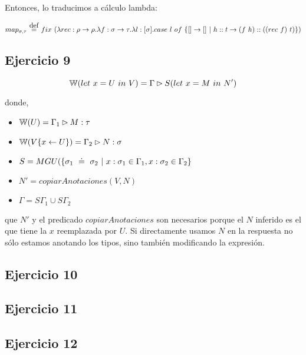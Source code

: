Entonces, lo traducimos a cálculo lambda:

\[map_{\sigma,\tau} \eqdef fix\ (\abs{rec}{\rho\to\rho}{\abs{f}{\sigma\to\tau}{\abs{l}{[\sigma]}{case\ l\ of\ \{[] \to [] \vert h::t \to (f\ h)::((rec\ f)\ t)\}}}}) \]


\subsection*{Ejercicio 9}

\[\mathbb{W}(let\ x = U\ in\ V) = \Gamma \rhd S(let\ x = M\ in\ N')\]

donde,

\begin{itemize}
  \item $\mathbb{W}(U) = \Gamma_1 \rhd M : \tau$
  \item $\mathbb{W}(V\{x\leftarrow U\}) = \Gamma_2 \rhd N: \sigma$
  \item $S = MGU(\{\sigma_1 \uni \sigma_2 \vert x:\sigma_1 \in \Gamma_1, x:\sigma_2 \in \Gamma_2\}$
  \item $N' = copiarAnotaciones(V,N)$
  \item $\Gamma = S\Gamma_1 \cup S\Gamma_2$
\end{itemize}

 que $N'$ y el predicado $copiarAnotaciones$ son necesarios porque el $N$ inferido es el que tiene la $x$ reemplazada por $U$. Si directamente usamos $N$ en la respuesta no sólo estamos anotando los tipos, sino también modificando la expresión.


\subsection*{Ejercicio 10}


\subsection*{Ejercicio 11}


\subsection*{Ejercicio 12}


